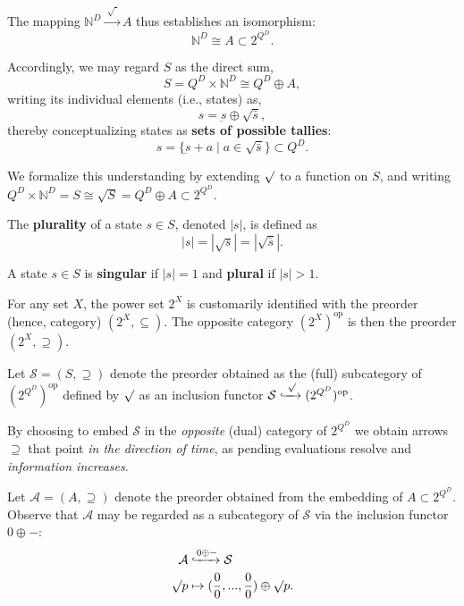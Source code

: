 \documentclass{article}
\newcommand{\N}{\mathbb{N}}
\renewcommand{\S}{\ensuremath{\mathcal{S}}} %
\newcommand{\A}{\ensuremath{\mathcal{A}}}
\DeclareMathOperator{\dual}{op}
\begin{document}
\begin{fact}
  The mapping $\N^D \xrightarrow{\;\surd\;} A$ thus establishes an isomorphism:
  $$
  \N^D \cong A \subset 2^{Q^D}.
  $$
\end{fact}

\begin{fact}
  Accordingly, we may regard $S$ as the direct sum,
  $$
  S = Q^D \times \N^D \cong Q^D \oplus A,
  $$
  writing its individual elements (i.e., states) as,
  $$
  s = \underbar{s} \oplus \surd \bar{s},
  $$
  thereby conceptualizing states as \textbf{sets of possible tallies}:
  $$
  s = \{ \underbar{s} + a \mid a \in \surd \bar{s} \} \subset Q^D.
  $$
\end{fact}

\begin{nota}
  We formalize this understanding by extending $\surd$ to a function on $S$, and writing $Q^D \times \N^D = S \cong \surd S = Q^D \oplus A \subset 2^{Q^D}$.
\end{nota}

\begin{defn}
  The \textbf{plurality} of a state $s \in S$, denoted $|s|$, is defined as
  $$
  |s| = |\surd s| = |\surd\bar{s}|.
  $$
\end{defn}

\begin{defn}
  A state $s \in S$ is \textbf{singular} if $|s|=1$ and \textbf{plural} if $|s|>1$.
\end{defn}

\begin{nota}
  For any set $X$, the power set $2^X$ is customarily identified with the preorder (hence, category) $(2^X, \subseteq)$.  The opposite category $(2^X)^{\dual}$ is then the preorder $(2^X, \supseteq)$.
\end{nota}

\begin{nota}
  Let $\S = (S,\supseteq)$ denote the preorder obtained as the (full) subcategory of $(2^{Q^D})^{\dual}$ defined by $\surd$ as an inclusion functor $\S \xhookrightarrow{\;\surd\;} (2^{Q^D})^{\dual}$.
\end{nota}

By choosing to embed $\S$ in the {\em opposite} (dual) category of $2^{Q^D}$ we obtain arrows $\supseteq$ that point {\em in the direction of time}, as pending evaluations resolve and {\em information increases}.

\begin{nota}
  Let $\A = (A,\supseteq)$ denote the preorder obtained from the embedding of $A \subset 2^{Q^D}$.  Observe that $\A$ may be regarded as a subcategory of $\S$ via the inclusion functor $0 \oplus -$:
  \begin{align}
    \A & \xhookrightarrow{0 \oplus -} \S \\
    \surd p & \mapsto (\frac{0}{0},...,\frac{0}{0}) \oplus \surd p.
  \end{align}
\end{nota}
\end{document}
